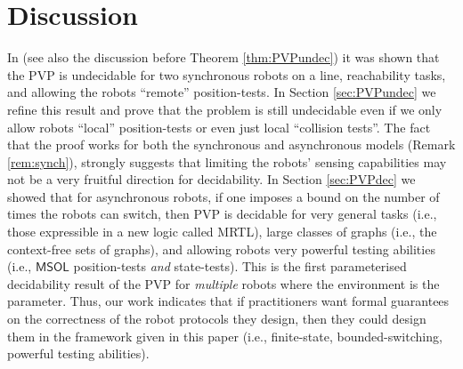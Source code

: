 \documentclass{llncs}
\newtheorem{note}{Note}
\def\MRTL{\textsf{MRTL}}
\def\gclass{\mathcal{G}}
\def\rclass{\mathcal{R}}
\def\T{\mathrm{T}}
\def\PVP{\mathsf{PVP}}
\newcommand{\tup}[1]{\overline{#1}}
\def\fol{\mathsf{FOL}}
\def\msol{\mathsf{MSOL}}
\def\fotc{\mathsf{FOL+TC}}
\begin{document}
%
%

\vspace{-1mm}

\section{Discussion}
\vspace{-1mm}

In \cite{BlHe67,Rubin15AAMAS} (see also the discussion before Theorem \ref{thm:PVPundec}) it was shown that the PVP is undecidable for two synchronous robots on a line, reachability tasks, and allowing the robots ``remote'' position-tests. In Section \ref{sec:PVPundec} we refine this result and prove that the problem is still undecidable even if we only allow robots ``local'' position-tests or even just local ``collision tests''. The fact that the proof works for both the synchronous and asynchronous models (Remark \ref{rem:synch}), strongly suggests that limiting the robots' sensing capabilities may not be a very fruitful direction for decidability. In Section \ref{sec:PVPdec} we showed that for asynchronous robots, if one imposes a bound on the number of times the robots can switch, then PVP is decidable for very general tasks (i.e., those expressible in a new logic called \MRTL), large classes of graphs (i.e., the context-free sets of graphs), and allowing robots very powerful testing abilities (i.e., $\msol$ position-tests {\em and} state-tests). This is the first parameterised decidability result of the PVP for {\em multiple} robots where the environment is the parameter. Thus, our work indicates that if practitioners want formal guarantees on the correctness of the robot protocols they design, then they could design them in the framework given in this paper (i.e., finite-state, bounded-switching, powerful testing abilities).
\end{document}
